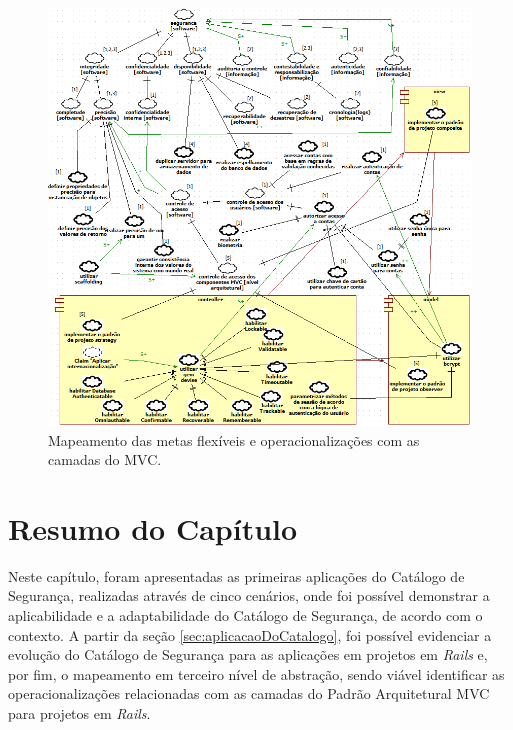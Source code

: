 \begin{figure}[h!]
	\centering
	\includegraphics[keepaspectratio=true,scale=0.7]{figuras/catalogoMapeado.PNG}
	\caption{Mapeamento das metas flexíveis e operacionalizações com as camadas do MVC.}
	\label{catalogoMapeado}
\end{figure}

\pagebreak

\section*{Resumo do Capítulo}

Neste capítulo, foram apresentadas as primeiras aplicações do Catálogo de Segurança, realizadas através de cinco cenários, onde foi possível demonstrar a aplicabilidade e a adaptabilidade do Catálogo de Segurança, de acordo com o contexto. A partir da seção \ref{sec:aplicacaoDoCatalogo}, foi possível evidenciar a evolução do Catálogo de Segurança para as aplicações em projetos em \textit{Rails} e, por fim, o mapeamento em terceiro nível de abstração, sendo viável identificar as operacionalizações relacionadas com as camadas do Padrão Arquitetural MVC para projetos em \textit{Rails}.

